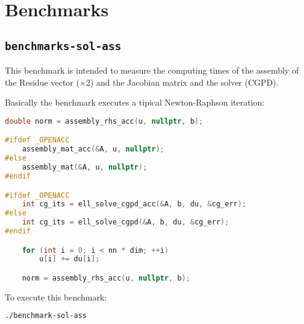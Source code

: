 
\section{Benchmarks}

\subsection{\texttt{benchmarks-sol-ass}}

This benchmark is intended to measure the computing times of the assembly of the Residue vector ($\times2$) and the
Jacobian matrix and the solver (CGPD).

Basically the benchmark executes a tipical Newton-Raphson iteration:

\begin{lstlisting}[language=c++, backgroundcolor=\color{lightgray} ]
	double norm = assembly_rhs_acc(u, nullptr, b);

#ifdef _OPENACC
	assembly_mat_acc(&A, u, nullptr);
#else
	assembly_mat(&A, u, nullptr);
#endif

#ifdef _OPENACC
	int cg_its = ell_solve_cgpd_acc(&A, b, du, &cg_err);
#else
	int cg_its = ell_solve_cgpd(&A, b, du, &cg_err);
#endif

	for (int i = 0; i < nn * dim; ++i)
		u[i] += du[i];

	norm = assembly_rhs_acc(u, nullptr, b);
\end{lstlisting}

To execute this benchmark:

\begin{lstlisting}[language=Bash,backgroundcolor=\color{lightgray} ]
./benchmark-sol-ass
\end{lstlisting}

